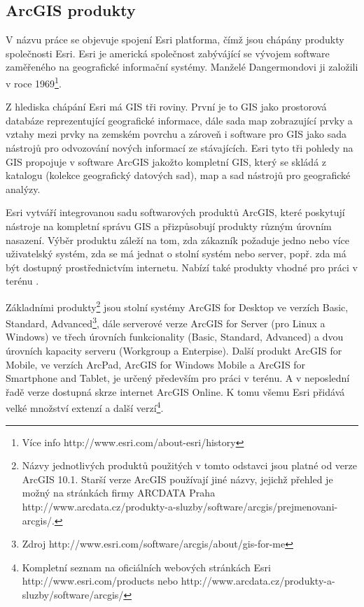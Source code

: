 
\subsection{ArcGIS produkty}

        V názvu práce se objevuje spojení Esri platforma, čímž jsou chápány
        produkty společnosti Esri. Esri je americká společnost zabývájící se
        vývojem software zaměřeného na geografické informační systémy. Manželé
        Dangermondovi ji založili v roce 1969\footnote{Více info
        http://www.esri.com/about-esri/history}.

        Z hlediska chápání Esri má GIS tři roviny. První je to GIS jako
        prostorová databáze reprezentující geografické informace, dále sada map
        zobrazující prvky a vztahy mezi prvky na zemském povrchu a zároveň i
        software pro GIS jako sada nástrojů pro odvozování nových informací ze
        stávajících. Esri tyto tři pohledy na GIS propojuje v software ArcGIS
        jakožto kompletní GIS, který se skládá z katalogu (kolekce geografický
        datových sad), map a sad nástrojů pro geografické analýzy.

        Esri vytváří integrovanou sadu softwarových produktů ArcGIS, které
        poskytují nástroje na kompletní správu GIS a přizpůsobují produkty
        různým úrovním nasazení. Výběr produktu záleží na tom, zda zákazník
        požaduje jedno nebo více uživatelský systém, zda se má jednat o stolní
        systém nebo server, popř. zda má být dostupný prostřednictvím
        internetu. Nabízí také produkty vhodné pro práci v terénu
        \citep{Esri2006}.

        Základními produkty\footnote{Názvy jednotlivých produktů použitých v
        tomto odstavci jsou platné od verze ArcGIS 10.1. Starší verze ArcGIS
        používají jiné názvy, jejichž přehled je možný na stránkách firmy ARCDATA
        Praha http://www.arcdata.cz/produkty-a-sluzby/software/arcgis/prejmenovani-arcgis/.
        } jsou stolní systémy ArcGIS for Desktop ve verzích Basic, Standard,
        Advanced\footnote{Zdroj http://www.esri.com/software/arcgis/about/gis-for-me},
        dále serverové verze ArcGIS for Server (pro Linux a Windows) ve třech úrovních
        funkcionality (Basic, Standard, Advanced) a dvou úrovních kapacity serveru
        (Workgroup a Enterpise). Další produkt ArcGIS for Mobile, ve verzích ArcPad,
        ArcGIS for Windows Mobile a ArcGIS for Smartphone and Tablet, je určený
        především pro práci v terénu. A v neposlední řadě verze dostupná skrze internet
        ArcGIS Online. K tomu všemu Esri přidává velké množství extenzí a další
        verzí\footnote{ Kompletní seznam na oficiálních webových stránkách Esri
        http://www.esri.com/products nebo http://www.arcdata.cz/produkty-a-sluzby/software/arcgis/}. 

